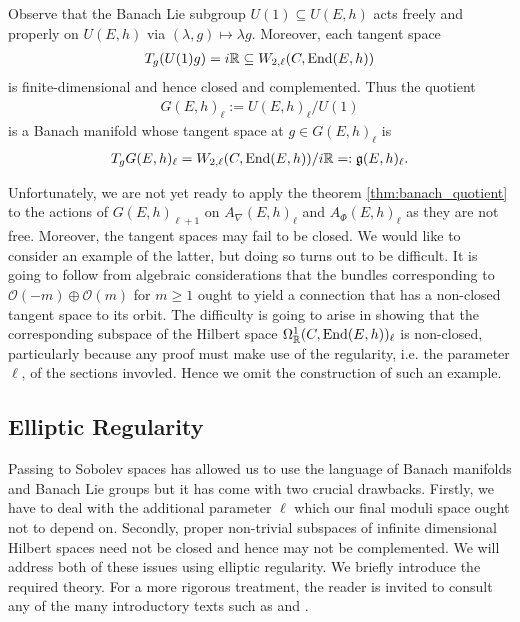 \documentclass[12pt]{ociamthesis}  %
\begin{document}
\begin{example}
  Observe that the Banach Lie subgroup $U(1)\subseteq U(E,h)$ acts freely and properly
  on $U(E,h)$ via $(\lambda,g)\mapsto \lambda g$. Moreover, each tangent space
  \begin{align*}
    T_g(U(1)g) =
    i\mathbb{R} \subseteq W_{2,\ell}(C,\operatorname{End}(E,h))
  \end{align*}
  is finite-dimensional and hence closed and complemented.  Thus the quotient
  \begin{align*}
    G(E,h)_{\ell} := U(E,h)_\ell / U(1)
  \end{align*}
  is a Banach manifold whose tangent space at $g\in G(E,h)_\ell$ is
  \begin{align*}
    T_g G(E,h)_\ell =  W_{2,\ell}(C,\operatorname{End}(E,h))/i\mathbb{R} =: \mathfrak g(E,h)_\ell.
  \end{align*}
\end{example}

Unfortunately, we are not yet ready to apply the theorem \ref{thm:banach_quotient} to
the actions of $G(E,h)_{\ell+1}$ on $A_\nabla(E,h)_\ell$ and
$A_\Phi(E,h)_\ell$ as they are not free. Moreover, the tangent spaces
may fail to be closed. We would like to consider an example of the latter,
but doing so turns out to be difficult. It is going to follow from algebraic
considerations that the bundles corresponding to $\mathscr O(-m)\oplus\mathscr O(m)$ for $m\geq 1$ ought
to yield a connection that has a non-closed tangent space to its orbit.
The difficulty is going to arise in showing that the corresponding subspace
of the Hilbert space $\Omega^1_{\mathbb R}(C,\operatorname{End}(E,h))_\ell$ is non-closed,
particularly because any proof must make use of the regularity, i.e.
the parameter $\ell$, of the sections invovled. Hence we omit the construction
of such an example.

\subsection{Elliptic Regularity}\label{sec:elliptic_regularity}

Passing to Sobolev spaces has allowed us to use the language of
Banach manifolds and Banach Lie groups but it has come with two
crucial drawbacks. Firstly, we have to deal with the additional
parameter $\ell$ which our final moduli space ought not to depend on.
Secondly, proper non-trivial subspaces of infinite dimensional Hilbert
spaces need not be closed and hence may not be complemented.
We will address both of these issues using elliptic regularity.
We briefly introduce the required theory.
For a more rigorous treatment, the reader is invited to consult
any of the many introductory texts such as \cite{hance2014} and
\cite[Chapter 6]{warner1983}.
\end{document}
